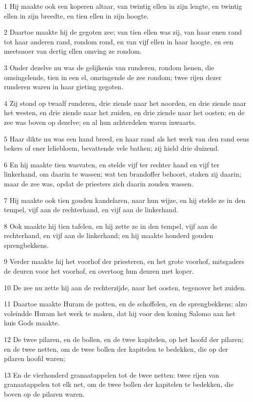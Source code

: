 \par 1 Hij maakte ook een koperen altaar, van twintig ellen in zijn lengte, en twintig ellen in zijn breedte, en tien ellen in zijn hoogte.
\par 2 Daartoe maakte hij de gegoten zee; van tien ellen was zij, van haar enen rand tot haar anderen rand, rondom rond, en van vijf ellen in haar hoogte, en een meetsnoer van dertig ellen omving ze rondom.
\par 3 Onder dezelve nu was de gelijkenis van runderen, rondom henen, die omsingelende, tien in een el, omringende de zee rondom; twee rijen dezer runderen waren in haar gieting gegoten.
\par 4 Zij stond op twaalf runderen, drie ziende naar het noorden, en drie ziende naar het westen, en drie ziende naar het zuiden, en drie ziende naar het oosten; en de zee was boven op dezelve; en al hun achterdelen waren inwaarts.
\par 5 Haar dikte nu was een hand breed, en haar rand als het werk van den rand eens bekers of ener leliebloem, bevattende vele bathen; zij hield drie duizend.
\par 6 En hij maakte tien wasvaten, en stelde vijf ter rechter hand en vijf ter linkerhand, om daarin te wassen; wat ten brandoffer behoort, staken zij daarin; maar de zee was, opdat de priesters zich daarin zouden wassen.
\par 7 Hij maakte ook tien gouden kandelaren, naar hun wijze, en hij stelde ze in den tempel, vijf aan de rechterhand, en vijf aan de linkerhand.
\par 8 Ook maakte hij tien tafelen, en hij zette ze in den tempel, vijf aan de rechterhand, en vijf aan de linkerhand; en hij maakte honderd gouden sprengbekkens.
\par 9 Verder maakte hij het voorhof der priesteren, en het grote voorhof, mitsgaders de deuren voor het voorhof, en overtoog hun deuren met koper.
\par 10 De zee nu zette hij aan de rechterzijde, naar het oosten, tegenover het zuiden.
\par 11 Daartoe maakte Huram de potten, en de schoffelen, en de sprengbekkens; alzo voleindde Huram het werk te maken, dat hij voor den koning Salomo aan het huis Gods maakte.
\par 12 De twee pilaren, en de bollen, en de twee kapitelen, op het hoofd der pilaren; en de twee netten, om de twee bollen der kapitelen te bedekken, die op der pilaren hoofd waren;
\par 13 En de vierhonderd granaatappelen tot de twee netten: twee rijen van granaatappelen tot elk net, om de twee bollen der kapitelen te bedekken, die boven op de pilaren waren.
